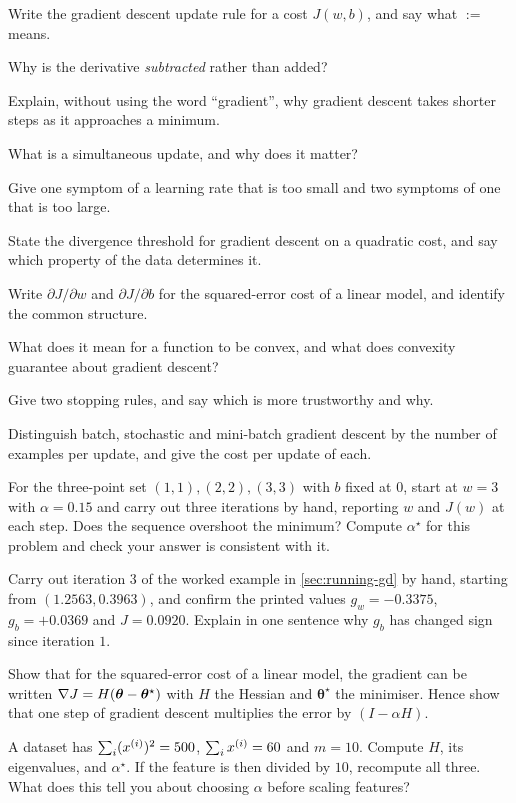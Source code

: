 
\sq Write the gradient descent update rule for a cost $J(w,b)$, and say what
$:=$ means.

\sq Why is the derivative \emph{subtracted} rather than added?

\sq Explain, without using the word ``gradient'', why gradient descent takes
shorter steps as it approaches a minimum.

\sq What is a simultaneous update, and why does it matter?

\sq Give one symptom of a learning rate that is too small and two symptoms of
one that is too large.

\sq State the divergence threshold for gradient descent on a quadratic cost, and
say which property of the data determines it.

\sq Write $\partial J/\partial w$ and $\partial J/\partial b$ for the
squared-error cost of a linear model, and identify the common structure.

\sq What does it mean for a function to be convex, and what does convexity
guarantee about gradient descent?

\sq Give two stopping rules, and say which is more trustworthy and why.

\sq Distinguish batch, stochastic and mini-batch gradient descent by the number
of examples per update, and give the cost per update of each.


\ap For the three-point set $(1,1),(2,2),(3,3)$ with $b$ fixed at $0$, start at
$w = 3$ with $\alpha = 0.15$ and carry out three iterations by hand, reporting
$w$ and $J(w)$ at each step. Does the sequence overshoot the minimum? Compute
$\alpha^\star$ for this problem and check your answer is consistent with it.

\ap Carry out iteration $3$ of the worked example in \cref{sec:running-gd} by
hand, starting from $(1.2563, 0.3963)$, and confirm the printed values
$g_w = -0.3375$, $g_b = +0.0369$ and $J = 0.0920$. Explain in one sentence why
$g_b$ has changed sign since iteration $1$.

\ap Show that for the squared-error cost of a linear model, the gradient can be
written $\nabla J = H(\bm{\theta} - \bm{\theta}^\star)$ with $H$ the Hessian and
$\bm{\theta}^\star$ the minimiser. Hence show that one step of gradient descent
multiplies the error by $(I - \alpha H)$.

\ap A dataset has $\sum_i (x^{(i)})^2 = 500$, $\sum_i x^{(i)} = 60$ and $m = 10$.
Compute $H$, its eigenvalues, and $\alpha^\star$. If the feature is then divided
by $10$, recompute all three. What does this tell you about choosing $\alpha$
before scaling features?

